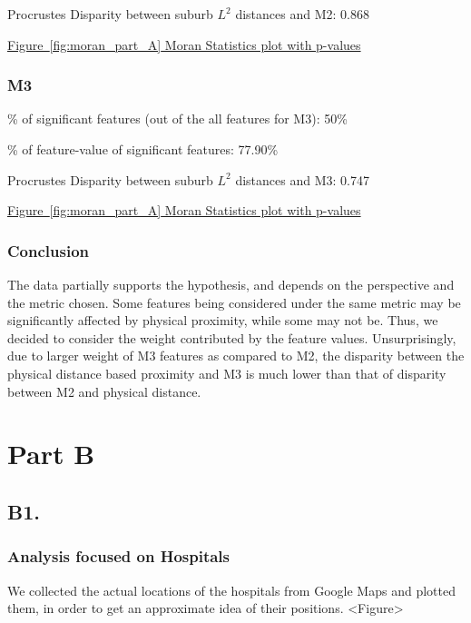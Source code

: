 \documentclass[
	a4paper, %
	10pt, %
	unnumberedsections, %
	twoside, %
]{LTJournalArticle}
\begin{document}
Procrustes Disparity between suburb $L^2$ distances and M2: 0.868

\hyperref[fig:moran_part_A]{Figure~\ref{fig:moran_part_A} Moran Statistics plot with p-values}


\subsubsection{M3}\leavevmode

\% of significant features (out of the all features for M3): 50\%

\% of feature-value of significant features: 77.90\%

Procrustes Disparity between suburb $L^2$ distances and M3: 0.747

\hyperref[fig:moran_part_A]{Figure~\ref{fig:moran_part_A} Moran Statistics plot with p-values}


\subsubsection{Conclusion}\leavevmode

The data partially supports the hypothesis, and depends on the perspective and the metric chosen. Some features being considered under the same metric may be significantly affected by physical proximity, while some may not be. Thus, we decided to consider the weight contributed by the feature values. Unsurprisingly, due to larger weight of M3 features as compared to M2, the disparity between the physical distance based proximity and M3 is much lower than that of disparity between M2 and physical distance.

\pagebreak

\section{Part B}

\subsection{B1.}

\subsubsection{Analysis focused on Hospitals}

We collected the actual locations of the hospitals from Google Maps and plotted them, in order to get an approximate idea of their positions. <Figure>
\end{document}
